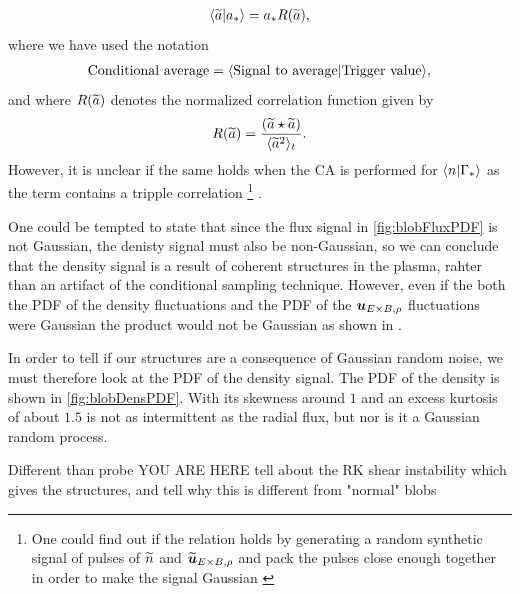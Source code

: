 %
\begin{align*}
    \langle{\widetilde{ a}}|{a_*}\rangle = a_*R(\widetilde{ a}),
\end{align*}
%
where we have used the notation
%
\begin{align*}
    \text{Conditional average} = \langle{\text{Signal to average}}|{\text{Trigger value}}\rangle,
\end{align*}
%
and where $R(\widetilde{ a})$ denotes the normalized correlation function given by
%
\begin{align*}
    R(\widetilde{ a}) = \frac{(\widetilde{ a}\star\widetilde{ a})}{\langle{\widetilde{ a}^2}\rangle_t}.
\end{align*}
%
However, it is unclear if the same holds when the CA is performed for $\langle{n}|{\Gamma_*}\rangle$ as the term contains a tripple correlation%
\footnote{One could find out if the relation holds by generating a random synthetic signal of pulses of $\widetilde{ n}$ and $\widetilde{ \boldsymbol{u}}_{E\times B, \rho}$ and pack the pulses close enough together in order to make the signal Gaussian \cite{PecseliPrivate}}%
.

One could be tempted to state that since the flux signal in \cref{fig:blobFluxPDF} is not Gaussian, the denisty signal must also be non-Gaussian, so we can conclude that the density signal is a result of coherent structures in the plasma, rahter than an artifact of the conditional sampling technique.
However, even if the both the PDF of the density fluctuations and the PDF of the $\boldsymbol{u}_{E\times B,\rho}$ fluctuations were Gaussian the product would not be Gaussian as shown in \cite{Bergsaker2015}.

In order to tell if our structures are a consequence of Gaussian random noise, we must therefore look at the PDF of the density signal.
The PDF of the density is shown in \cref{fig:blobDensPDF}.
With its skewness around $1$ and an excess kurtosis of about $1.5$ is not as intermittent as the radial flux, but nor is it a Gaussian random process.
%


Different than probe
YOU ARE HERE
tell about the RK shear instability which gives the structures, and tell why this is different from "normal" blobs


